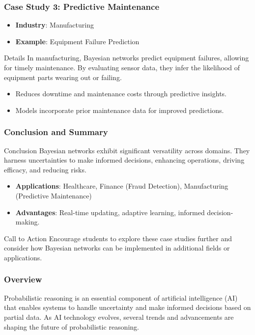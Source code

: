 \documentclass[aspectratio=169]{beamer}
\begin{document}
\begin{frame}[fragile]
    \frametitle{Case Study 3: Predictive Maintenance}
    \begin{itemize}
        \item \textbf{Industry}: Manufacturing
        \item \textbf{Example}: Equipment Failure Prediction
    \end{itemize}
    \begin{block}{Details}
        In manufacturing, Bayesian networks predict equipment failures, allowing for timely maintenance. By evaluating sensor data, they infer the likelihood of equipment parts wearing out or failing.
    \end{block}
    \begin{itemize}
        \item Reduces downtime and maintenance costs through predictive insights.
        \item Models incorporate prior maintenance data for improved predictions.
    \end{itemize}
\end{frame}

\begin{frame}[fragile]
    \frametitle{Conclusion and Summary}
    \begin{block}{Conclusion}
        Bayesian networks exhibit significant versatility across domains. They harness uncertainties to make informed decisions, enhancing operations, driving efficacy, and reducing risks.
    \end{block}
    \begin{itemize}
        \item \textbf{Applications}: Healthcare, Finance (Fraud Detection), Manufacturing (Predictive Maintenance)
        \item \textbf{Advantages}: Real-time updating, adaptive learning, informed decision-making.
    \end{itemize}
    \begin{block}{Call to Action}
        Encourage students to explore these case studies further and consider how Bayesian networks can be implemented in additional fields or applications.
    \end{block}
\end{frame}

\begin{frame}[fragile]
    \frametitle{Overview}
    Probabilistic reasoning is an essential component of artificial intelligence (AI) that enables systems to handle uncertainty and make informed decisions based on partial data. As AI technology evolves, several trends and advancements are shaping the future of probabilistic reasoning.
\end{frame}
\end{document}
